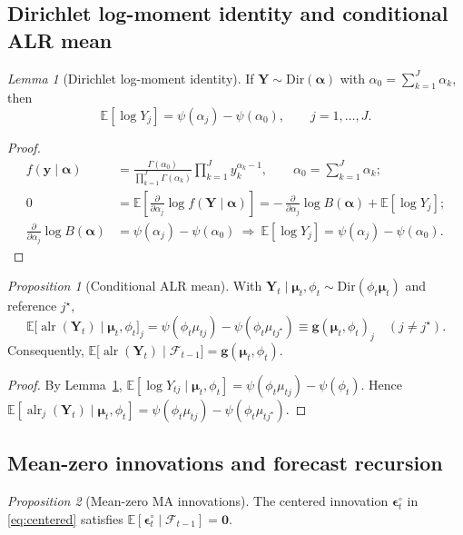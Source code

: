 \documentclass[12pt]{article}
\newcommand{\calF}{\mathcal{F}}
\theoremstyle{remark}
\newtheorem{prop}{Proposition}
\newtheorem{lemma}{Lemma}
\newcommand{\Dir}{\mathrm{Dir}}
\newcommand{\E}{\mathbb{E}}
\newcommand{\alr}{\operatorname{alr}}
\newcommand{\bfmu}{\boldsymbol{\mu}}
\newcommand{\bfY}{\mathbf{Y}}
\begin{document}
\subsection{Dirichlet log-moment identity and conditional ALR mean}
\begin{lemma}[Dirichlet log-moment identity]
\label{lem:dirichlet-log-moment}
If $\bfY\sim\Dir(\boldsymbol{\alpha})$ with $\alpha_0=\sum_{k=1}^J \alpha_k$, then
\[
\E[\log Y_j] = \psi(\alpha_j)-\psi(\alpha_0), \qquad j=1,\dots,J.
\]
\end{lemma}

\begin{proof}
\[
\begin{aligned}
f(\mathbf y\mid\boldsymbol{\alpha})
&= \frac{\Gamma(\alpha_0)}{\prod_{k=1}^J \Gamma(\alpha_k)}
   \prod_{k=1}^J y_k^{\alpha_k-1},\qquad
\alpha_0=\sum_{k=1}^J \alpha_k;\\[0.25em]
0
&= \E\!\left[\frac{\partial}{\partial \alpha_j}\log f(\bfY\mid\boldsymbol{\alpha})\right]
 = -\,\frac{\partial}{\partial \alpha_j}\log B(\boldsymbol{\alpha})
   + \E[\log Y_j];\\
\frac{\partial}{\partial \alpha_j}\log B(\boldsymbol{\alpha})
&= \psi(\alpha_j)-\psi(\alpha_0)
\ \Rightarrow\ 
\E[\log Y_j]=\psi(\alpha_j)-\psi(\alpha_0).
\end{aligned}
\]\qedhere
\end{proof}

\begin{prop}[Conditional ALR mean]
\label{prop:conditional-alr-mean}
With $\bfY_t\mid \bfmu_t,\phi_t\sim\Dir(\phi_t\bfmu_t)$ and reference $j^\star$,
\[
\E\!\big[\alr(\bfY_t)\mid \bfmu_t,\phi_t\big]_j
=\psi(\phi_t\mu_{tj})-\psi(\phi_t\mu_{t j^\star})
\equiv \mathbf{g}(\bfmu_t,\phi_t)_j\quad (j\neq j^\star).
\]
Consequently, $\E\!\big[\alr(\bfY_t)\mid \calF_{t-1}\big]=\mathbf{g}(\bfmu_t,\phi_t)$.
\end{prop}

\begin{proof}
By Lemma~\ref{lem:dirichlet-log-moment}, $\E[\log Y_{tj}\mid \bfmu_t,\phi_t]=\psi(\phi_t\mu_{tj})-\psi(\phi_t)$.
Hence $\E[\alr_j(\bfY_t)\mid \bfmu_t,\phi_t]=\psi(\phi_t\mu_{tj})-\psi(\phi_t\mu_{t j^\star})$.
\end{proof}

\subsection{Mean-zero innovations and forecast recursion}
\begin{prop}[Mean-zero MA innovations]
\label{prop:mds}
The centered innovation $\boldsymbol{\epsilon}_t^\circ$ in \eqref{eq:centered} satisfies $\E[\boldsymbol{\epsilon}_t^\circ\mid \calF_{t-1}]=\mathbf{0}$.
\end{prop}
\end{document}
